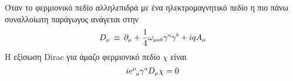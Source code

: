 Όταν το φερμιονικό πεδίο αλληλεπιδρά με ένα 
ηλεκτρομαγνητικό πεδίο 
η πιο πάνω συναλλοίωτη παράγωγος ανάγεται στην 
\begin{equation}
    D\subscr{\mu}\,\equiv\,\partial\subscr{\mu}+\frac{1}{4}\omega\subscr{\mu ab}\gamma\superscr{a}\gamma\superscr{b}+iqA\subscr{\mu}
\end{equation}
Η εξίσωση Dirac για άμαζο φερμιονικό πεδίο $\chi$ είναι
\begin{equation}\label{general dirac equation}
    ie\superscr{\mu}\subscr{\;\;a}\gamma\superscr{a}D\subscr{\mu}\chi=0
\end{equation}
\\

